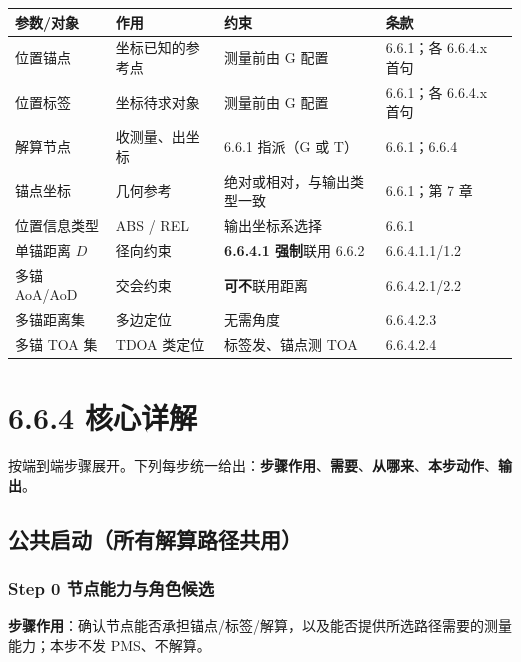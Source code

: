 \documentclass[11pt,a4paper]{ctexart}
\begin{document}
\begin{table}[h]
\centering
\small
\begin{tabular}{L{2.8cm}L{4.2cm}L{4.0cm}l}
\toprule
\textbf{参数/对象} & \textbf{作用} & \textbf{约束} & \textbf{条款} \\
\midrule
位置锚点 & 坐标已知的参考点 & 测量前由 G 配置 & 6.6.1；各 6.6.4.x 首句 \\
位置标签 & 坐标待求对象 & 测量前由 G 配置 & 6.6.1；各 6.6.4.x 首句 \\
解算节点 & 收测量、出坐标 & 6.6.1 指派（G 或 T） & 6.6.1；6.6.4 \\
锚点坐标 & 几何参考 & 绝对或相对，与输出类型一致 & 6.6.1；第 7 章 \\
位置信息类型 & ABS / REL & 输出坐标系选择 & 6.6.1 \\
单锚距离 $D$ & 径向约束 & \textbf{6.6.4.1 强制}联用 6.6.2 & 6.6.4.1.1/1.2 \\
多锚 AoA/AoD & 交会约束 & \textbf{可不}联用距离 & 6.6.4.2.1/2.2 \\
多锚距离集 & 多边定位 & 无需角度 & 6.6.4.2.3 \\
多锚 TOA 集 & TDOA 类定位 & 标签发、锚点测 TOA & 6.6.4.2.4 \\
\bottomrule
\end{tabular}
\end{table}

\section{6.6.4 核心详解}

按端到端步骤展开。下列每步统一给出：\textbf{步骤作用}、\textbf{需要}、\textbf{从哪来}、\textbf{本步动作}、\textbf{输出}。

\subsection{公共启动（所有解算路径共用）}
\label{sec:common}

\subsubsection{Step 0 节点能力与角色候选}

\textbf{步骤作用}：确认节点能否承担锚点/标签/解算，以及能否提供所选路径需要的测量能力；本步不发 PMS、不解算。
\end{document}
